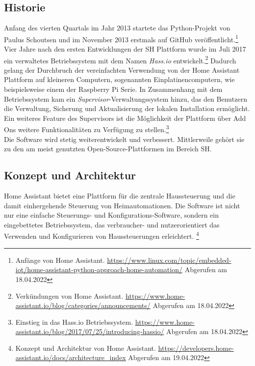     \subsection*{Historie}
    \label{sec:historyHOAS}
        Anfang des vierten Quartals im Jahr 2013 startete das Python-Projekt von Paulus Schoutsen und im November 2013 erstmals auf GitHub 
        veröffentlicht.\footnote{Anfänge von Home Assistant. \url{https://www.linux.com/topic/embedded-iot/home-assistant-python-approach-home-automation/} Abgerufen am 18.04.2022}
        \\
        \linebreak
        Vier Jahre nach den ersten Entwicklungen der \acl{SH} Plattform wurde im Juli 2017 ein verwaltetes Betriebssystem mit dem Namen 
        \textit{Hass.io} entwickelt.\footnote{Verkündungen von Home Assistant. \url{https://www.home-assistant.io/blog/categories/announcements/} Abgerufen am 18.04.2022} 
        Dadurch gelang der Durchbruch der vereinfachten Verwendung von der Home Assistant Plattform auf kleineren Computern, sogenannten 
        Einplatinencomputern, wie beispielsweise einem der Raspberry Pi Serie. In Zusammenhang mit dem Betriebssystem kam ein 
        \textit{Supervisor}-Verwaltungssystem hinzu, das den Benutzern die Verwaltung, Sicherung und Aktualisierung der lokalen Installation 
        ermöglicht. Ein weiteres Feature des Supervisors ist die Möglichkeit der Plattform über Add Ons weitere Funktionalitäten zu Verfügung zu 
        stellen.\footnote{Einstieg in das Hass.io Betriebssystem. \url{https://www.home-assistant.io/blog/2017/07/25/introducing-hassio/} Abgerufen am 18.04.2022}
        \\
        \linebreak
        Die Software wird stetig weiterentwickelt und verbessert. Mittlerweile gehört sie zu den am meist genutzten Open-Source-Plattformen 
        im Bereich \acl{SH}.

\subsection{Konzept und Architektur}
\label{sec:conceptArchitectureHAOS}
    Home Assistant bietet eine Plattform für die zentrale Haussteuerung und die damit einhergehende Steuerung von Heimautomationen. Die 
    Software ist nicht nur eine einfache Steuerungs- und Konfigurations-Software, sondern ein eingebettetes Betriebssystem, das 
    verbraucher- und nutzerorientiert das Verwenden und Konfigurieren von Haussteuerungen erleichtert. \footnote{Konzept und Architektur von Home Assistant. \url{https://developers.home-assistant.io/docs/architecture_index} Abgerufen am 19.04.2022}
    \\
    

